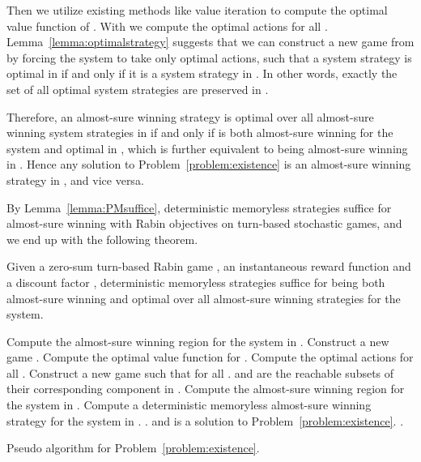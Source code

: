 \documentclass[runningheads,a4paper]{llncs}
\begin{document}
Then we utilize existing methods like value iteration to compute the optimal value function  of . With  we compute the optimal actions  for all . Lemma~\ref{lemma:optimalstrategy} suggests that we can construct a new game  from  by forcing the system to take only optimal actions, such that a system strategy is optimal in  if and only if it is a system strategy in . In other words, exactly the set of all optimal system strategies are preserved in . 

Therefore, an almost-sure winning strategy  is optimal over all almost-sure winning system strategies in  if and only if  is both almost-sure winning for the system and optimal in , which is further equivalent to being almost-sure winning in . Hence any solution  to Problem~\ref{problem:existence} is an almost-sure winning strategy in , and vice versa. 

By Lemma~\ref{lemma:PMsuffice}, deterministic memoryless strategies suffice for almost-sure winning with Rabin objectives on turn-based stochastic games, and we end up with the following theorem. 

\begin{theorem}
Given a zero-sum turn-based Rabin game , an instantaneous reward function  and a discount factor , 
deterministic memoryless strategies suffice for being both almost-sure winning and optimal over all almost-sure winning strategies for the system. 
\label{thm:optimalsufficiency}
\end{theorem}
 




\begin{algorithm}[!t]
\begin{algorithmic}[1]
    \State Compute the almost-sure winning region  for the system in . \State Construct a new game . 
    \State Compute the optimal value function  for . 
    \State Compute the optimal actions  for all .
\State Construct a new game  such that  for all .  and  are the reachable subsets of their corresponding component in .
\State Compute the almost-sure winning region  for the system in . \If{} 
    		\State Compute a deterministic memoryless almost-sure winning strategy  for the system in . .
        \State \Return \True and  is a solution to Problem~\ref{problem:existence}.
\Else
    		\State \Return \False.
\EndIf
\end{algorithmic}
\caption{Pseudo algorithm for Problem~\ref{problem:existence}.}
\label{alg:p1}
\end{algorithm}
\end{document}
